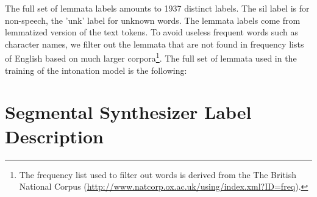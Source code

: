 The full set of lemmata labels amounts to 1937 distinct labels.
The \textlangle{}sil\textrangle{} label is for non-speech, the '\textlangle{}unk\textrangle{}' label for unknown words. The lemmata labels come from lemmatized version of the text tokens. To avoid useless frequent words such as character names, we filter out the lemmata that are not found in frequency lists of English based on much larger corpora\footnote{The frequency list used to filter out words is derived from the The British National Corpus (\url{http://www.natcorp.ox.ac.uk/using/index.xml?ID=freq}).}. The full set of lemmata used in the training of the intonation model is the following:
\newline


 

 



 
 
 
 
 
 
 
 
 
 



\chapter{Segmental Synthesizer Label Description}\label{chap:appendix-c}

